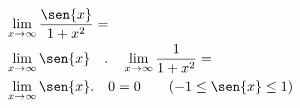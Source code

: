 \begin{ex}
\begin{align}
&\lim_{x\rightarrow \infty} \frac{\sen{x}}{1+x^2}=\nonumber\\
&\lim_{x\rightarrow \infty} \sen{x}\quad.\quad\lim_{x\rightarrow \infty} \frac{1}{1+x^2}=\nonumber\\
&\lim_{x\rightarrow \infty} \sen{x}.\quad0=0\quad\quad(-1\leq\sen{x}\leq1)\nonumber
\end{align}
\end{ex}